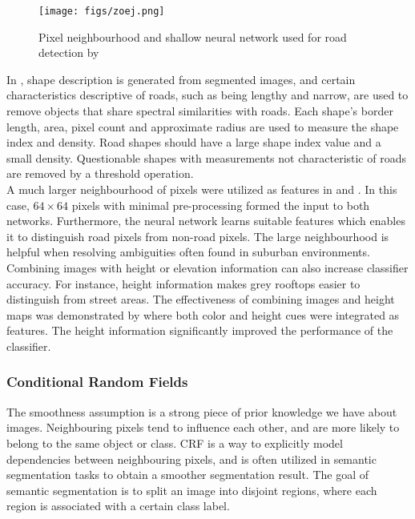 \begin{figure}
\begin{center}
\texttt{[image: figs/zoej.png]}
\caption[Shallow neural network]{Pixel neighbourhood and shallow neural network used for road detection by \cite{Mokhtarzade_road_ann} }
\label{fig:zoej_neural_network}
\end{center}
\end{figure}

In \cite{Song_road_extraction_svm}, shape description is generated from segmented images, and certain characteristics descriptive of roads, such as being lengthy and narrow, are used to remove objects that share spectral similarities with roads. Each shape's border length, area, pixel count and approximate radius are used to measure the shape index and density. Road shapes should have a large shape index value and a small density. Questionable shapes with measurements not characteristic of roads are removed by a threshold operation.\\

A much larger neighbourhood of pixels were utilized as features in \citep{Mnih_aerial_images_noisy} and \citep{Mnih_roads_high_res_aerial_images}. In this case, $64 \times 64$ pixels with minimal pre-processing formed the input to both  networks. Furthermore, the neural network learns suitable features which enables it to distinguish road pixels from non-road pixels. The large neighbourhood is helpful when resolving ambiguities often found in suburban environments. \\

  Combining images with height or elevation information can also increase classifier accuracy. For instance, height information makes grey rooftops easier to distinguish from street areas. The effectiveness of combining images and height maps was demonstrated by \cite{Kluckner_semantic_height} where both color and height cues were integrated as features. The height information significantly improved the performance of the classifier.
  

\subsubsection{Conditional Random Fields}
The smoothness assumption is a strong piece of prior knowledge we have about images. Neighbouring pixels tend to influence each other, and are more likely to belong to the same object or class. \ac{CRF} is a way to explicitly model dependencies between neighbouring pixels, and is often utilized in semantic segmentation tasks to obtain a smoother segmentation result. The goal of semantic segmentation is to split an image into disjoint regions, where each region is associated with a certain class label.\\

